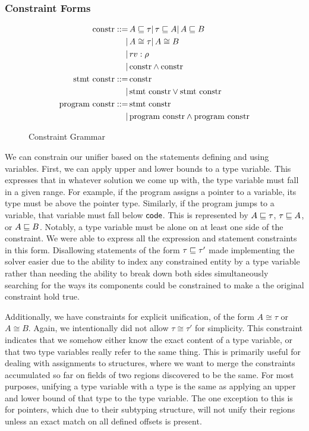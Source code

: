 \subsubsection{Constraint Forms}
\newcommand{\constr}{\textrm{constr}}
\newcommand{\sconstr}{\textrm{stmt constr}}
\newcommand{\pconstr}{\textrm{program constr}}
\newcommand{\unify}{\cong}
\begin{figure}[t]
\begin{align*}
\constr ::=&\, A \subt \tau
          |\, \tau \subt A
          |\, A \subt B\\
          |&\, A \unify \tau |\, A \unify B\\
          |&\, rv : \rho\\
          |&\, \constr \wedge \constr\\
\sconstr ::=&\, \constr\\
          |&\, \sconstr \vee \sconstr\\
\pconstr ::=&\, \sconstr\\
          |&\, \pconstr \wedge \pconstr\\
\end{align*}
\caption{Constraint Grammar}
\label{fig:cform}
\end{figure}

We can constrain our unifier based on the statements defining and using variables. First, we can apply upper and lower bounds to a type variable. This expresses that in whatever solution we come up with, the type variable must fall in a given range. For example, if the program assigns a pointer to a variable, its type must be above the pointer type. Similarly, if the program jumps to a variable, that variable must fall below $\mathsf{code}$. This is represented by $A \sqsubseteq \tau$, $\tau \sqsubseteq A$, or $A \sqsubseteq B$. Notably, a type variable must be alone on at least one side of the constraint. We were able to express all the expression and statement constraints in this form. Disallowing statements of the form $\tau \sqsubseteq \tau'$ made implementing the solver easier due to the ability to index any constrained entity by a type variable rather than needing the ability to break down both sides simultaneously searching for the ways its components could be constrained to make a the original constraint hold true.

Additionally, we have constraints for explicit unification, of the form $A \unify \tau$ or $A \unify B$. Again, we intentionally did not allow $\tau \unify \tau'$ for simplicity. This constraint indicates that we somehow either know the exact content of a type variable, or that two type variables really refer to the same thing. This is primarily useful for dealing with assignments to structures, where we want to merge the constraints accumulated so far on fields of two regions discovered to be the same. For most purposes, unifying a type variable with a type is the same as applying an upper and lower bound of that type to the type variable. The one exception to this is for pointers, which due to their subtyping structure, will not unify their regions unless an exact match on all defined offsets is present.

